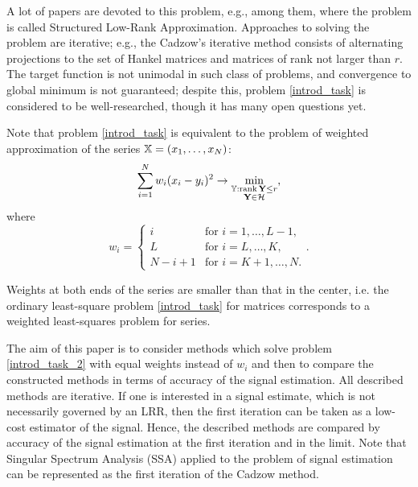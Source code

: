\documentclass[sii]{ipart}
\def\rank{\mathop{\mathrm{rank}}}
\begin{document}
A lot of papers are devoted to this problem, e.g., \cite{Cadzow1988, Markovsky2011, Usevich.Markovsky2014, Gillard.Zhigljavsky2013} among them, where the problem is called Structured Low-Rank Approximation. Approaches to solving the problem are iterative; e.g., the Cadzow's iterative method \cite{Cadzow1988} consists of alternating projections to the set of Hankel matrices and matrices of rank not larger than $r$. The target function is not unimodal in such class of problems, and convergence to global minimum is not guaranteed; despite this, problem \eqref{introd_task} is considered to be well-researched, though it has many open questions yet.

Note that problem \eqref{introd_task} is equivalent to the problem of weighted approximation of the series $\mathbb{X} = (x_1, \ldots, x_N)$:
\begin{equation}\label{introd_task_2}
\sum_{i = 1}^N w_i(x_i - y_i)^2 \to \min_{\substack{\tsY: \rank \bfY \le r \\ \bfY \in \calH}},
\end{equation}
where
\begin{equation}
\label{eq:w}
w_i = \begin{cases}
i & \text{for $i = 1, \ldots, L-1,$}\\
L & \text{for $i = L, \ldots, K,$}\\
N - i + 1 & \text{for $i = K + 1, \ldots, N.$}
\end{cases}.
\end{equation}

Weights at both ends of the series are smaller than that in the center, i.e. the ordinary least-square problem \eqref{introd_task} for matrices corresponds to a weighted least-squares problem for series.

The aim of this paper is to consider methods which solve problem \eqref{introd_task_2} with equal weights instead of $w_i$ and then to compare the constructed methods in terms of accuracy of the signal estimation. All described methods are iterative.
If one is interested in a signal estimate, which is not necessarily governed by an LRR, then the first iteration can be taken as a low-cost estimator of the signal.
Hence, the described methods are compared by accuracy of the signal estimation at the first iteration and in the limit. Note that Singular Spectrum Analysis (SSA) \cite{Broomhead.King1986, Vautard.etal1992, Elsner.Tsonis1996, Golyandina.etal2001, Ghil.etal2002, Golyandina.Zhigljavsky2012} applied to the problem of signal estimation can be represented as the first iteration of the Cadzow method.
\end{document}
